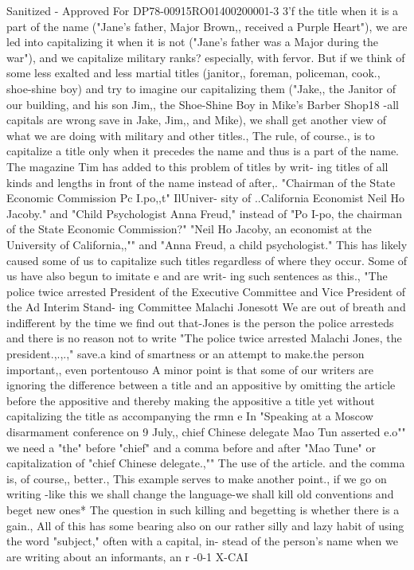 \documentclass[
    oneside,
    11pt,
    draft
]{memoir}
\begin{document}
Sanitized - Approved For DP78-00915RO01400200001-3 3'f the title when it is a part of the name ("Jane's father, Major Brown,, received a Purple Heart"), we are led into capitalizing it when it is not ("Jane's father was a Major during the war"), and we capitalize military ranks? especially, with fervor. But if we think of some less exalted and less martial titles (janitor,, foreman, policeman, cook., shoe-shine boy) and try to imagine our capitalizing them ("Jake,, the Janitor of our building, and his son Jim,, the Shoe-Shine Boy in Mike's Barber Shop18 -all capitals are wrong save in Jake, Jim,, and Mike), we shall get another view of what we are doing with military and other titles., The rule, of course., is to capitalize a title only when it precedes the name and thus is a part of the name. The magazine Tim has added to this problem of titles by writ- ing titles of all kinds and lengths in front of the name instead of after,. "Chairman of the State Economic Commission Pc I.po,,t" IlUniver- sity of ..California Economist Neil Ho Jacoby." and "Child Psychologist Anna Freud," instead of "Po I-po, the chairman of the State Economic Commission?" "Neil Ho Jacoby, an economist at the University of California,,"" and "Anna Freud, a child psychologist." This has likely caused some of us to capitalize such titles regardless of where they occur. Some of us have also begun to imitate e and are writ- ing such sentences as this., "The police twice arrested President of the Executive Committee and Vice President of the Ad Interim Stand- ing Committee Malachi Jonesott We are out of breath and indifferent by the time we find out that-Jones is the person the police arresteds and there is no reason not to write "The police twice arrested Malachi Jones, the president.,.,.," save.a kind of smartness or an attempt to make.the person important,, even portentouso A minor point is that some of our writers are ignoring the difference between a title and an appositive by omitting the article before the appositive and thereby making the appositive a title yet without capitalizing the title as accompanying the rmn e In "Speaking at a Moscow disarmament conference on 9 July,, chief Chinese delegate Mao Tun asserted e.o"" we need a "the" before "chief" and a comma before and after "Mao Tune" or capitalization of "chief Chinese delegate.,"" The use of the article. and the comma is, of course,, better., This example serves to make another point., if we go on writing -like this we shall change the language-we shall kill old conventions and beget new ones* The question in such killing and begetting is whether there is a gain., All of this has some bearing also on our rather silly and lazy habit of using the word "subject," often with a capital, in- stead of the person's name when we are writing about an informants, an r -0-1 X-CAI
\end{document}
